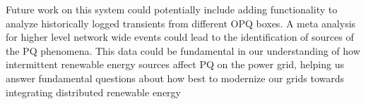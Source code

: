 \documentclass[10pt, conference, compsocconf]{IEEEtran}
\begin{document}
Future work on this system could potentially include adding functionality to analyze historically logged transients from different OPQ boxes. A meta analysis for higher level network wide events could lead to the identification of sources of the PQ phenomena. This data could be fundamental in our understanding of how intermittent renewable energy sources affect PQ on the power grid, helping us answer fundamental questions about how best to modernize our grids towards integrating distributed renewable energy





%
%
%
%
%




\end{document}
